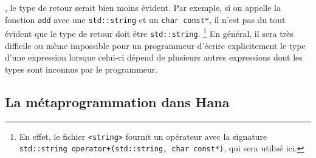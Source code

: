 , le type de retour serait bien moins évident. Par exemple, si on appelle la
fonction {\tt add} avec une {\tt std::string} et un {\tt char const*}, il
n'est pas du tout évident que le type de retour doit être {\tt std::string}.
    \footnote{En effet, le fichier {\tt <string>} fournit un opérateur avec la
    signature {\tt std::string operator+(std::string, char const*)}, qui sera
    utilisé ici.}
En général, il sera très difficile ou même impossible pour un programmeur
d'écrire explicitement le type d'une expression lorsque celui-ci dépend de
plusieurs autres expressions dont les types sont inconnus par le programmeur.


\subsection{La métaprogrammation dans Hana}







